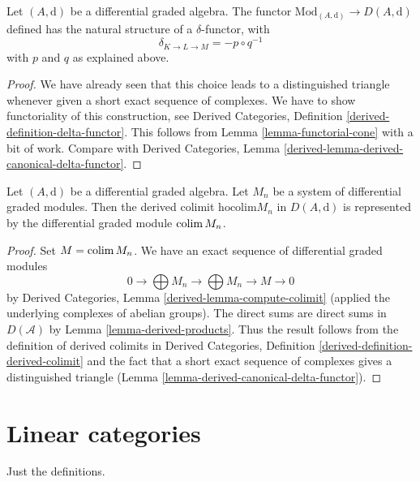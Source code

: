 \begin{lemma}
\label{lemma-derived-canonical-delta-functor}
Let $(A, \text{d})$ be a differential graded algebra. The functor
$\text{Mod}_{(A, \text{d})} \to D(A, \text{d})$
defined has the natural structure of a $\delta$-functor, with
$$
\delta_{K \to L \to M} = - p \circ q^{-1}
$$
with $p$ and $q$ as explained above.
\end{lemma}

\begin{proof}
We have already seen that this choice leads to a distinguished
triangle whenever given a short exact sequence of complexes.
We have to show functoriality of this construction, see
Derived Categories, Definition \ref{derived-definition-delta-functor}.
This follows from Lemma \ref{lemma-functorial-cone} with a bit of
work. Compare with
Derived Categories, Lemma \ref{derived-lemma-derived-canonical-delta-functor}.
\end{proof}

\begin{lemma}
\label{lemma-homotopy-colimit}
Let $(A, \text{d})$ be a differential graded algebra. Let
$M_n$ be a system of differential graded modules. Then the derived
colimit $\text{hocolim} M_n$ in $D(A, \text{d})$ is represented
by the differential graded module $\mathop{\mathrm{colim}}\nolimits M_n$.
\end{lemma}

\begin{proof}
Set $M = \mathop{\mathrm{colim}}\nolimits M_n$. We have an exact sequence of differential graded modules
$$
0 \to \bigoplus M_n \to \bigoplus M_n \to M \to 0
$$
by Derived Categories, Lemma \ref{derived-lemma-compute-colimit}
(applied the underlying complexes of abelian groups).
The direct sums are direct sums in $D(\mathcal{A})$ by
Lemma \ref{lemma-derived-products}.
Thus the result follows from the definition
of derived colimits in Derived Categories,
Definition \ref{derived-definition-derived-colimit}
and the fact that a short exact sequence of complexes
gives a distinguished triangle
(Lemma \ref{lemma-derived-canonical-delta-functor}).
\end{proof}








\section{Linear categories}
\label{section-linear}

\noindent
Just the definitions.

